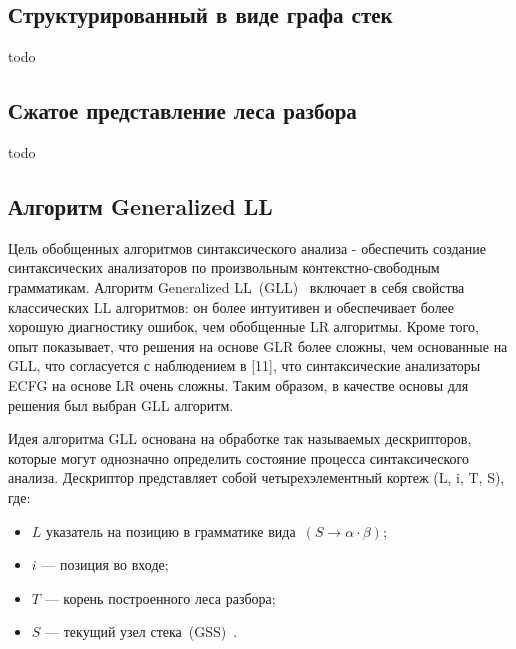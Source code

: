 \documentclass[12pt]{matmex-diploma-custom}
\begin{document}
	\subsection{Структурированный в виде графа стек}
	todo
	\subsection{Сжатое представление леса разбора}
	todo
	\subsection{Алгоритм Generalized LL}
	
	Цель обобщенных алгоритмов синтаксического анализа - обеспечить создание синтаксических
	анализаторов по произвольным контекстно-свободным грамматикам.
	Алгоритм Generalized LL~(GLL)~\cite{scott2010gll} включает в себя свойства классических LL алгоритмов:
	он более интуитивен и обеспечивает более хорошую диагностику ошибок, 
	чем обобщенные LR алгоритмы. Кроме того, опыт показывает, что решения на основе
	GLR более сложны, чем основанные на GLL, что согласуется с наблюдением в [11], что
	синтаксические анализаторы ECFG на основе LR очень сложны. Таким образом, в качестве
	основы для решения был выбран GLL алгоритм. 
	
	Идея алгоритма GLL основана на обработке так называемых дескрипторов, которые 
	могут однозначно определить состояние процесса синтаксического анализа. Дескриптор
	представляет собой четырехэлементный кортеж (L, i, T, S), где:
	\begin{itemize}
		\item $L$ указатель на позицию в грамматике вида~$(S \to \alpha \cdot \beta)$;
		\item $i$ --- позиция во входе;
		\item $T$ --- корень построенного леса разбора;
		\item $S$ --- текущий узел стека~(GSS)~\cite{afroozeh2015faster}.
	\end{itemize}
	
\end{document}
